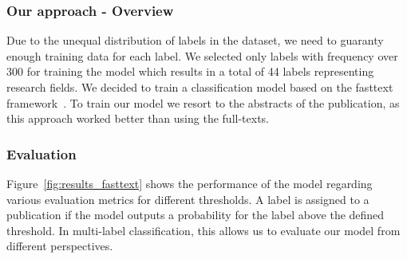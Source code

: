 \subsubsection{Our approach - Overview }
Due to the unequal distribution of labels in the dataset, we need to guaranty enough training data for each label.
We selected only labels with frequency over 300 for training the model which results in a total of 44 labels representing research fields.
We decided to train a classification model based on the fasttext framework~\cite{joulin2017bag}. To train our model we resort to the abstracts of the publication, as this approach worked better than using the full-texts.  



\subsubsection{Evaluation}
Figure~\ref{fig:results_fasttext} shows the performance of the model regarding various evaluation metrics for different thresholds. A label is assigned to a publication if the model outputs a probability for the label above the defined threshold. In multi-label classification, this allows us to evaluate our model from different perspectives.


